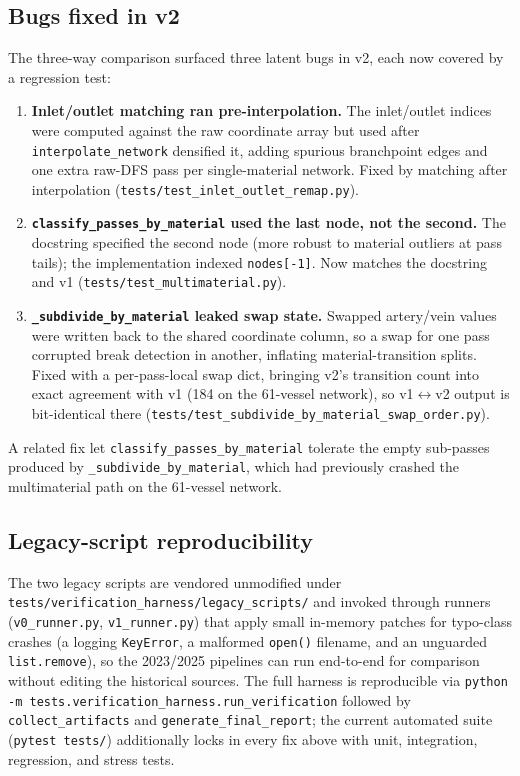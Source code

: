 \documentclass[11pt,a4paper]{article}
\begin{document}
\subsection{Bugs fixed in v2}

The three-way comparison surfaced three latent bugs in v2, each now covered
by a regression test:

\begin{enumerate}[leftmargin=2em]
    \item \textbf{Inlet/outlet matching ran pre-interpolation.} The
    inlet/outlet indices were computed against the raw coordinate array but
    used after \texttt{interpolate\_network} densified it, adding spurious
    branchpoint edges and one extra raw-DFS pass per single-material
    network. Fixed by matching after interpolation
    (\texttt{tests/test\_inlet\_outlet\_remap.py}).
    \item \textbf{\texttt{classify\_passes\_by\_material} used the last node,
    not the second.} The docstring specified the second node (more robust to
    material outliers at pass tails); the implementation indexed
    \texttt{nodes[-1]}. Now matches the docstring and v1
    (\texttt{tests/test\_multimaterial.py}).
    \item \textbf{\texttt{\_subdivide\_by\_material} leaked swap state.}
    Swapped artery/vein values were written back to the shared coordinate
    column, so a swap for one pass corrupted break detection in another,
    inflating material-transition splits. Fixed with a per-pass-local swap
    dict, bringing v2's transition count into exact agreement with v1 (184 on
    the 61-vessel network), so v1$\leftrightarrow$v2 output is bit-identical there
    (\texttt{tests/test\_subdivide\_by\_material\_swap\_order.py}).
\end{enumerate}

A related fix let \texttt{classify\_passes\_by\_material} tolerate the empty
sub-passes produced by \texttt{\_subdivide\_by\_material}, which had
previously crashed the multimaterial path on the 61-vessel network.

\subsection{Legacy-script reproducibility}

The two legacy scripts are vendored unmodified under
\texttt{tests/verification\_harness/legacy\_scripts/} and invoked through
runners (\texttt{v0\_runner.py}, \texttt{v1\_runner.py}) that apply small
in-memory patches for typo-class crashes (a logging \texttt{KeyError}, a
malformed \texttt{open()} filename, and an unguarded \texttt{list.remove}),
so the 2023/2025 pipelines can run end-to-end for comparison without editing
the historical sources. The full harness is reproducible via
\texttt{python -m tests.verification\_harness.run\_verification} followed by
\texttt{collect\_artifacts} and \texttt{generate\_final\_report}; the current
automated suite (\texttt{pytest tests/}) additionally locks in every fix
above with unit, integration, regression, and stress tests.
\end{document}
